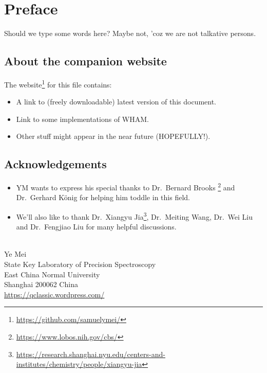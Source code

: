 \chapter*{Preface}
Should we type some words here? Maybe not, 'coz we are not talkative persons.

\section*{About the companion website}
The website\footnote{\url{https://github.com/samuelymei/}} for this file contains:
\begin{itemize}
  \item A link to (freely downloadable) latest version of this document.
  \item Link to some implementations of WHAM.
  \item Other stuff might appear in the near future (HOPEFULLY!).
\end{itemize}

\section*{Acknowledgements}
\begin{itemize}
\item YM wants to express his special thanks to Dr.~Bernard Brooks \footnote{\url{https://www.lobos.nih.gov/cbs/}} and Dr.~Gerhard K\"onig for helping him toddle in this field.
\item We'll also like to thank Dr.~Xiangyu Jia\footnote{\url{https://research.shanghai.nyu.edu/centers-and-institutes/chemistry/people/xiangyu-jia}}, Dr.~Meiting Wang, Dr.~Wei Liu and Dr.~Fengjiao Liu for many helpful discussions.
\end{itemize}
\mbox{}\\
\noindent Ye Mei \\
\noindent State Key Laboratory of Precision Spectroscopy\\
\noindent East China Normal University\\
\noindent Shanghai 200062 China\\
\noindent \url{https://qclassic.wordpress.com/}